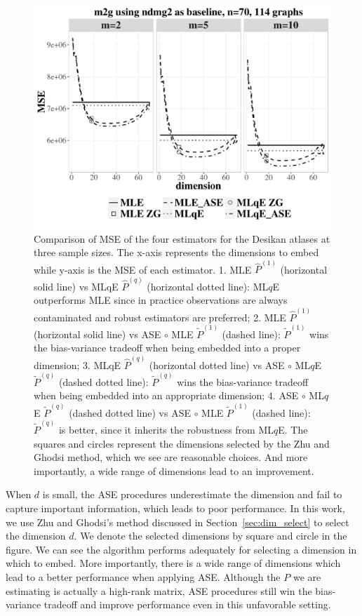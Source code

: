 \begin{figure}
\centering
\includegraphics[width=\textwidth]{./Figures/CCI.pdf}
\caption{Comparison of MSE of the four estimators for the Desikan atlases at three sample sizes.
The x-axis represents the dimensions to embed while y-axis is the MSE of each estimator.
1. MLE $\hat{P}^{(1)}$ (horizontal solid line) vs MLqE $\hat{P}^{(q)}$ (horizontal dotted line):
ML$q$E outperforms MLE since in practice observations are always contaminated and robust estimators are preferred;
2. MLE $\hat{P}^{(1)}$ (horizontal solid line) vs ASE $\circ$ MLE $\widetilde{P}^{(1)}$ (dashed line):
$\widetilde{P}^{(1)}$ wins the bias-variance tradeoff when being embedded into a proper dimension; 
3. MLqE $\hat{P}^{(q)}$ (horizontal dotted line) vs ASE $\circ$ ML$q$E $\widetilde{P}^{(q)}$ (dashed dotted line):
$\widetilde{P}^{(q)}$ wins the bias-variance tradeoff when being embedded into an appropriate dimension; 
4.  ASE $\circ$ ML$q$E $\widetilde{P}^{(q)}$ (dashed dotted line) vs ASE $\circ$ MLE $\widetilde{P}^{(1)}$ (dashed line):
$\widetilde{P}^{(q)}$ is better, since it inherits the robustness from ML$q$E. The squares and circles represent the dimensions selected by the Zhu and Ghodsi method, which we see are reasonable choices. And more importantly, a wide range of dimensions lead to an improvement.
}
\label{fig:CCI}
\end{figure}


When $d$ is small, the ASE procedures underestimate the dimension and fail to capture important information, which leads to poor performance. In this work, we use Zhu and Ghodsi's method discussed in Section~\ref{sec:dim_select} to select the dimension $d$. We denote the selected dimensions by square and circle in the figure. We can see the algorithm performs adequately for selecting a dimension in which to embed. More importantly, there is a wide range of dimensions which lead to a better performance when applying ASE. Although the $P$ we are estimating is actually a high-rank matrix, ASE procedures still win the bias-variance tradeoff and improve performance even in this unfavorable setting.

